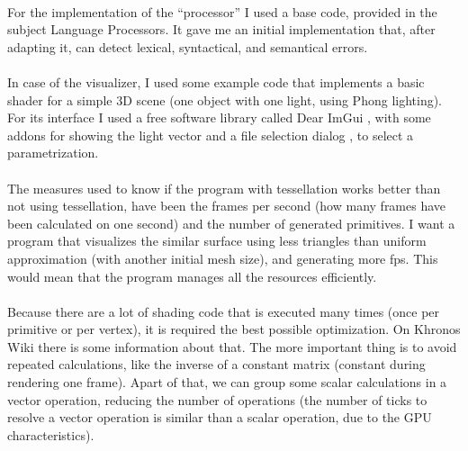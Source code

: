 \\For the implementation of the ``processor'' I used a base code, provided in the subject Language Processors. It gave me an initial implementation that, after adapting it, can detect lexical, syntactical, and semantical errors.\\
\\In case of the visualizer, I used some example code that implements a basic shader for a simple $3$D scene (one object with one light, using Phong lighting). For its interface I used a free software library called Dear ImGui \cite{DearImGui}, with some addons for showing the light vector \cite{LVector} and a file selection dialog \cite{Dialog}, to select a parametrization.\\
\\The measures used to know if the program with tessellation works better than not using tessellation, have been the frames per second (how many frames have been calculated on one second) and the number of generated primitives. I want a program that visualizes the similar surface using less triangles than uniform approximation (with another initial mesh size), and generating more fps. This would mean that the program manages all the resources efficiently.\\
\\Because there are a lot of shading code that is executed many times (once per primitive or per vertex), it is required the best possible optimization. On Khronos Wiki \cite{KhronosWiki} there is some information about that. The more important thing is to avoid repeated calculations, like the inverse of a constant matrix (constant during rendering one frame). Apart of that, we can group some scalar calculations in a vector operation, reducing the number of operations (the number of ticks to resolve a vector operation is similar than a scalar operation, due to the GPU characteristics).\\

